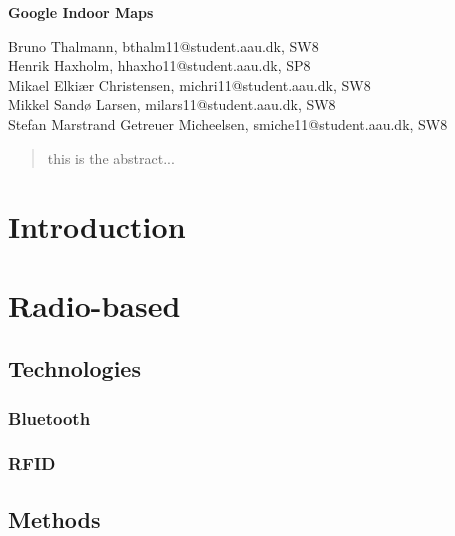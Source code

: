 \documentclass[12pt,a4paper]{article}
\begin{document}
\begin{center}
\bigskip\bigskip
{\Large\bf Google Indoor Maps}
\bigskip\bigskip


Bruno Thalmann, bthalm11@student.aau.dk, SW8\\
Henrik Haxholm, hhaxho11@student.aau.dk, SP8\\
Mikael Elkiær Christensen, michri11@student.aau.dk, SW8\\
Mikkel Sandø Larsen, milars11@student.aau.dk, SW8\\
Stefan Marstrand Getreuer Micheelsen, smiche11@student.aau.dk, SW8

\bigskip
\begin{abstract}
this is the abstract...
\end{abstract}

\thispagestyle{empty}
\end{center}


\titlepage



\thispagestyle{plain}


\section{Introduction}


\section{Radio-based}

\subsection{Technologies}


\subsubsection{Bluetooth}

\subsubsection{RFID}

\subsection{Methods}

\end{document}
